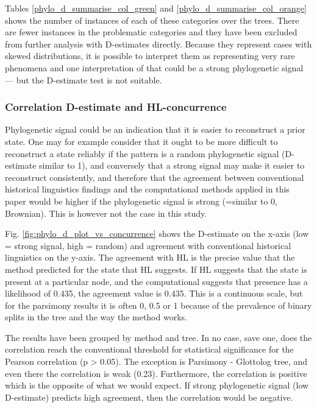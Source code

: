 \documentclass[12pt,letterpaper]{article}
\begin{document}
Tables \ref{phylo_d_summarise_col_green} and \ref{phylo_d_summarise_col_orange} shows the number of instances of each of these categories over the trees. There are fewer instances in the problematic categories and they have been excluded from further analysis with D-estimates directly. Because they represent cases with skewed distributions, it is possible to interpret them as representing very rare phenomena and one interpretation of that could be a strong phylogenetic signal --- but the D-estimate test is not suitable.






\FloatBarrier


\subsubsection{Correlation D-estimate and HL-concurrence}
\label{supp:cor_d_HL}
Phylogenetic signal could be an indication that it is easier to reconstruct a prior state. One may for example consider that it ought to be more difficult to reconstruct a state reliably if the pattern is a random phylogenetic signal (D-estimate similar to 1), and conversely that a strong signal may make it easier to reconstruct consistently, and therefore that the agreement between conventional historical linguistics findings and the computational methods applied in this paper would be higher if the phylogenetic signal is strong (=similar to 0, Brownian). This is however not the case in this study.

Fig. \ref{fig:phylo_d_plot_vs_concurrence} shows the D-estimate on the x-axis (low = strong signal, high = random) and agreement with conventional historical linguistics on the y-axis. The agreement with HL is the precise value that the method predicted for the state that HL suggests. If HL suggests that the state is present at a particular node, and the computational suggests that presence has a likelihood of 0.435, the agreement value is 0.435. This is a continuous scale, but for the parsimony results it is often 0, 0.5 or 1 because of the prevalence of binary splits in the tree and the way the method works.

The results have been grouped by method and tree. In no case, save one, does the correlation reach the conventional threshold for statistical significance for the Pearson correlation (p > 0.05). The exception is Parsimony - Glottolog tree, and even there the correlation is weak (0.23). Furthermore, the correlation is positive which is the opposite of what we would expect. If strong phylogenetic signal (low D-estimate) predicts high agreement, then the correlation would be negative. 
\end{document}
